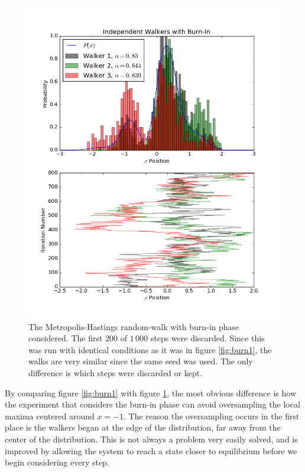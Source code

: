 \documentclass[twocolumn]{article}
\begin{document}
\begin{figure}[p]
	\centering
	\includegraphics[width=\linewidth]{burn2.png}
	\caption{
		The Metropolis-Hastings random-walk with burn-in phase considered. The first
		$200$ of $1\,000$ steps were discarded. Since this was run with identical
		conditions as it was in figure \ref{fig:burn1}, the walks are very similar
		since the same seed was used. The only difference is which steps were
		discarded or kept.
	}
	\label{fig:burn2}
\end{figure}

By comparing figure \ref{fig:burn1} with figure \ref{fig:burn2}, the most
obvious difference is how the experiment that considers the burn-in phase can
avoid oversampling the local maxima centered around $x = -1$. The reason the
oversampling occurs in the first place is the walkers began at the edge of the
distribution, far away from the center of the distribution. This is not always a
problem very easily solved, and is improved by allowing the system to reach a
state closer to equilibrium before we begin considering every step.
\end{document}
